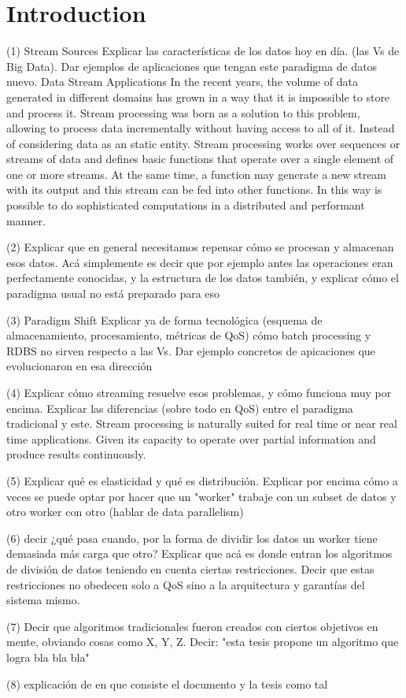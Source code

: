 \chapter{Introduction}
\label{chapter:introduction}

(1) \cite{laney20013d}   Stream Sources  \cite{kamburugamuve2013survey}
Explicar las características de los datos hoy en día. (las Vs de Big Data).
Dar ejemplos de aplicaciones que tengan este paradigma de datos nuevo. Data Stream Applications\cite{chakravarthy2009stream}
  In the recent years, the volume of data generated in different domains has
  grown in a way that it is impossible to store and process it.
  Stream processing was born as a solution to this problem, allowing to process
  data incrementally without having access to all of it.
  Instead of considering data as an static entity. Stream processing works over
  sequences or streams of data and defines basic functions that operate over a
  single element of one or more streams. At the same time, a function may
  generate a new stream with its output and this stream can be fed into other
  functions. In this way is possible to do sophisticated computations in a distributed and performant manner.

(2)
Explicar que en general necesitamos repensar cómo se procesan y almacenan esos datos. Acá simplemente es decir que por ejemplo antes las operaciones eran perfectamente conocidas, y la estructura de los datos también, y explicar cómo el paradigma usual no está preparado para eso

(3) Paradigm Shift\cite{chakravarthy2009stream}
Explicar ya de forma tecnológica (esquema de almacenamiento, procesamiento, métricas de QoS) cómo batch processing y RDBS no sirven respecto a las Vs. Dar ejemplo concretos de apicaciones que evolucionaron en esa dirección

(4)
Explicar cómo streaming resuelve esos problemas, y cómo funciona muy por encima. Explicar las diferencias (sobre todo en QoS) entre el paradigma tradicional y este.
  Stream processing is naturally suited for real time or near real time applications. Given its capacity to operate over partial information and produce results continuously.

(5)
Explicar qué es elasticidad y qué es distribución. Explicar por encima cómo a veces se puede optar por hacer que un "worker" trabaje con un subset de datos y otro worker con otro (hablar de data parallelism)

(6)
decir ¿qué pasa cuando, por la forma de dividir los datos un worker tiene demasiada más carga que otro? Explicar que acá es donde entran los algoritmos de división de datos teniendo en cuenta ciertas restricciones. Decir que estas restricciones no obedecen solo a QoS sino a la arquitectura y garantías del sistema mismo.

(7)
Decir que algoritmos tradicionales fueron creados con ciertos objetivos en mente, obviando cosas como X, Y, Z. Decir: "esta tesis propone un algoritmo que logra bla bla bla"

(8)
explicación de en que consiste el documento y la tesis como tal
